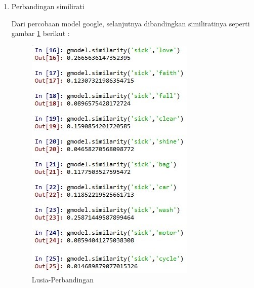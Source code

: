 \begin{enumerate}
\begin{enumerate}
		\item Perbandingan similirati
			\par Dari percobaan model google, selanjutnya dibandingkan similiratinya seperti gambar \ref{5b13} berikut : 
			
			\begin{figure}[!hbtp]
			\centering
			\includegraphics[scale=0.5]{figures/q1.jpg}
			\caption{Lusia-Perbandingan}
			\label{5b13}
			\end{figure}
			

\end{enumerate}
\end{enumerate}
